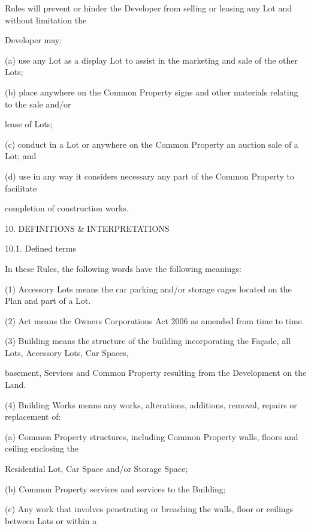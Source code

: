 \documentclass{article}
\begin{document}
{\fontsize{10.02}{1}Rules will prevent or hinder the Developer from selling or leasing any Lot and without limitation the }

{\fontsize{10.02}{1}Developer may: }

{\fontsize{9.962}{1}(a) use any Lot as a display Lot to assist in the marketing and sale of the other Lots; }

{\fontsize{9.962}{1}(b) place anywhere on the Common Property signs and other materials relating to the sale and/or }

{\fontsize{10.02}{1}lease of Lots; }

{\fontsize{9.962}{1}(c) conduct in a Lot or anywhere on the Common Property an auction sale of a Lot; and }

{\fontsize{9.962}{1}(d) use in any way it considers necessary any part of the Common Property to facilitate }

{\fontsize{10.02}{1}completion of construction works. }


{\fontsize{9.99}{1}10. DEFINITIONS \& INTERPRETATIONS }

{\fontsize{9.99}{1}10.1. Defined terms }

{\fontsize{10.02}{1}In these Rules, the following words have the following meanings: }

{\fontsize{9.962}{1}(1) Accessory Lots means the car parking and/or storage cages located on the Plan and part of a Lot. }

{\fontsize{9.962}{1}(2) Act means the Owners Corporations Act 2006 as amended from time to time. }

{\fontsize{9.962}{1}(3) Building means the structure of the building incorporating the Façade, all Lots, Accessory Lots, Car Spaces, }

{\fontsize{10.02}{1}basement, Services and Common Property resulting from the Development on the Land.  }

{\fontsize{9.962}{1}(4) Building Works means any works, alterations, additions, removal, repairs or replacement of: }

{\fontsize{9.962}{1}(a) Common Property structures, including Common Property walls, floors and ceiling enclosing the }

{\fontsize{10.02}{1}Residential Lot, Car Space and/or Storage Space; }

{\fontsize{9.962}{1}(b) Common Property services and services to the Building; }

{\fontsize{9.962}{1}(c) Any work that involves penetrating or breaching the walls, floor or ceilings between Lots or within a }
\end{document}
